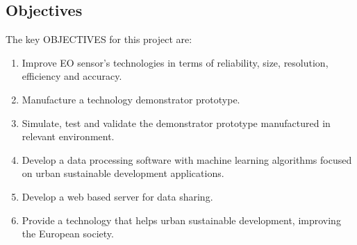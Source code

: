 \subsection{Objectives}

The key OBJECTIVES for this project are:

\begin{enumerate}

	\item Improve EO sensor's technologies in terms of reliability, size, resolution, efficiency and accuracy.

	\item Manufacture a technology demonstrator prototype.

	\item Simulate, test and validate the demonstrator prototype manufactured in relevant environment.

	\item Develop a data processing software with machine learning algorithms focused on urban sustainable development applications. 

	\item Develop a web based server for data sharing. 

	\item Provide a technology that helps urban sustainable development, improving the European society.
 
\end{enumerate}


